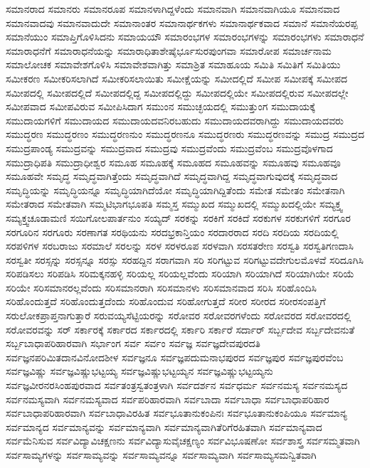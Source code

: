 {ಸಮಾನರಾದ
ಸಮಾನರು
ಸಮಾನರೂಪ
ಸಮಾನಳಾಗಿದ್ದಳೆಂದು
ಸಮಾನವಾಗಿ
ಸಮಾನವಾಗಿಯೂ
ಸಮಾನವಾದ
ಸಮಾನವಾದವು
ಸಮಾನವಾದುದೇ
ಸಮಾನಾಂತರ
ಸಮಾನಾರ್ಥಕಗಳು
ಸಮಾನಾರ್ಥಕವಾದ
ಸಮಾನೆ
ಸಮಾನೆಯರಪ್ಪ
ಸಮಾನೆಯುಂ
ಸಮಾಪ್ತಿಗೊಳಿಸಿದನು
ಸಮಾಯಯೌ
ಸಮಾರಂಭಗಳ
ಸಮಾರಂಭಗಳನ್ನು
ಸಮಾರಂಭಗಳು
ಸಮಾರಾಧನೆ
ಸಮಾರಾಧನೆಗೆ
ಸಮಾರಾಧನೆಯನ್ನು
ಸಮಾರಾಧಿತಾಶೇಷೈರ್ಭೂಸುರಪುಂಗವಾ
ಸಮಾರೋಪ
ಸಮಾರ್ಚನಾಮ
ಸಮಾಲೋಚಕ
ಸಮಾವೇಶಗೊಳಿಸಿ
ಸಮಾವೇಶವಾಗಿತ್ತು
ಸಮಾಶ್ರಿತ
ಸಮಾಹೂಯ
ಸಮಿತಿ
ಸಮಿತಿಗೆ
ಸಮಿತಿಯು
ಸಮೀಕರಣ
ಸಮೀಕರಿಸಲಾಗಿದೆ
ಸಮೀಕರಿಸಲಾಯಿತು
ಸಮೀಕ್ಷೆಯನ್ನು
ಸಮೀದಲ್ಲಿದೆ
ಸಮೀಪ
ಸಮೀಪಕ್ಕೆ
ಸಮೀಪದ
ಸಮೀಪದಲ್ಲಿ
ಸಮೀಪದಲ್ಲಿದೆ
ಸಮೀಪದಲ್ಲಿದ್ದ
ಸಮೀಪದಲ್ಲಿದ್ದು
ಸಮೀಪದಲ್ಲಿಯೇ
ಸಮೀಪದಲ್ಲಿರುವ
ಸಮೀಪದಲ್ಲೇ
ಸಮೀಪವಾದ
ಸಮೀಪವಿರುವ
ಸಮೀಪಿಸಿದಾಗ
ಸಮುಂನ
ಸಮುಚ್ಛಯದಲ್ಲಿ
ಸಮುತ್ತುಂಗ
ಸಮುದಾಯಕ್ಕೆ
ಸಮುದಾಯಗಳಿಗೆ
ಸಮುದಾಯದ
ಸಮುದಾಯದವನಿರಬಹುದು
ಸಮುದಾಯದವರಾಗಿದ್ದು
ಸಮುದಾಯದವರು
ಸಮುದ್ಧರಣ
ಸಮುದ್ಧರಣಂ
ಸಮುದ್ಧರಣನುಂ
ಸಮುದ್ಧರಣನೂ
ಸಮುದ್ಧರಣರು
ಸಮುದ್ಧರಣವನ್ನು
ಸಮುದ್ರ
ಸಮುದ್ರದ
ಸಮುದ್ರಪಾಂಡ್ಯ
ಸಮುದ್ರವನ್ನು
ಸಮುದ್ರವಾದ
ಸಮುದ್ರವು
ಸಮುದ್ರವೆಂದು
ಸಮುದ್ರವೆಂಬ
ಸಮುದ್ರವೊಳಗಾದ
ಸಮುದ್ರಾಧಿಪತಿ
ಸಮುದ್ರಾಧೀಶ್ವರ
ಸಮೂಹ
ಸಮೂಹಕ್ಕೆ
ಸಮೂಹದ
ಸಮೂಹವನ್ನು
ಸಮೂಹವು
ಸಮೂಹವೂ
ಸಮೂಹವೇ
ಸಮೃದ್ಧ
ಸಮೃದ್ಧವಾಗಿತ್ತೆಂದು
ಸಮೃದ್ಧವಾಗಿದೆ
ಸಮೃದ್ಧವಾಗಿದ್ದ
ಸಮೃದ್ಧವಾಗುವುದಕ್ಕೆ
ಸಮೃದ್ಧವಾದ
ಸಮೃದ್ಧಿಯನ್ನು
ಸಮೃದ್ಧಿಯನ್ನೂ
ಸಮೃದ್ಧಿಯಾಗಿದೆಯೋ
ಸಮೃದ್ಧಿಯಾಗಿದ್ದಿತೆಂದು
ಸಮೇತ
ಸಮೇತಂ
ಸಮೇತನಾಗಿ
ಸಮೇತರಾದ
ಸಮೇತವಾಗಿ
ಸಮ್ಮಟಿಭಾಗಭೂಪತಿ
ಸಮ್ಮಸ್ತ
ಸಮ್ಮುಖದ
ಸಮ್ಮುಖದಲ್ಲಿ
ಸಮ್ಮುಖದಲ್ಲಿಯೇ
ಸಮ್ಯಕ್ತ್ವ
ಸಮ್ಯಕ್ತ್ವಚೂಡಾಮಣಿ
ಸಯಿಗೋಲಪಾರ್ತನುಂ
ಸಯ್ಯದ್
ಸರಕನ್ನು
ಸರಕಿಗೆ
ಸರಕಿದೆ
ಸರಕುಗಳ
ಸರಕುಗಳಿಗೆ
ಸರಗೂರ
ಸರಗೂರಿನ
ಸರಗೂರು
ಸರಣಾಗತ
ಸರಥಿಯನು
ಸರದಭ್ರಕಾನ್ತಿಯಂ
ಸರದಾರರಾದ
ಸರದಿ
ಸರದಿಯ
ಸರದಿಯಲ್ಲಿ
ಸರಪಳಿಗಳ
ಸರಬರಾಜು
ಸರಮಾಲೆ
ಸರಲನ್ನು
ಸರಳ
ಸರಳರೂಪ
ಸರಳವಾಗಿ
ಸರಸತರೇಣ
ಸರಸ್ವತಿ
ಸರಸ್ವತಿಗಣದಾಸಿ
ಸರಸ್ವತೀ
ಸರಸ್ಸನ್ನು
ಸರಸ್ಸನ್ನೂ
ಸರಸ್ಸು
ಸರಹದ್ದಿನ
ಸರಾಗವಾಗಿ
ಸರಿ
ಸರಿಗಟ್ಟುವ
ಸರಿಗಟ್ಟುವದೇಗುಲಮೊಳವೆ
ಸರಿದೂಗಿಸಿ
ಸರಿಪಡಿಸಲು
ಸರಿಪಡಿಸಿ
ಸರಿಮಕ್ಕನಹಳ್ಳಿ
ಸರಿಯಲ್ಲ
ಸರಿಯಲ್ಲವೆಂದು
ಸರಿಯಾಗಿ
ಸರಿಯಾಗಿದೆ
ಸರಿಯಾಗಿಯೇ
ಸರಿಯೆ
ಸರಿಯೇ
ಸರಿಸಮಾನರಲ್ಲವೆಂದು
ಸರಿಸಮಾನರಾಗಿ
ಸರಿಸಮಾನಳು
ಸರಿಸಮಾನವಾದ
ಸರಿಸಿ
ಸರಿಹೊಂದಿಸಿ
ಸರಿಹೊಂದುತ್ತದೆ
ಸರಿಹೊಂದುತ್ತದೆಂದು
ಸರಿಹೊಂದುವ
ಸರಿಹೋಗುತ್ತದೆ
ಸರೀರ
ಸರೀರದ
ಸರೀರಸಂಪತ್ತಿಗೆ
ಸರುಲೋಕಪ್ರಾಪ್ತನಾಗುತ್ತಾರೆ
ಸರುವಯ್ಯಸೆಟ್ಟಿಯರನ್ನು
ಸರೋವರ
ಸರೋವರಗಳೆಂದು
ಸರೋವರದ
ಸರೋವರದಲ್ಲಿ
ಸರೋವರವನ್ನು
ಸರ್
ಸರ್ಕಾರಕ್ಕೆ
ಸರ್ಕಾರದ
ಸರ್ಕಾರದಲ್ಲಿ
ಸರ್ಕಾರಿ
ಸರ್ಕಾರೆ
ಸರ್ದಾರ್
ಸರ್ಬ್ಬದೇವ
ಸರ್ಬ್ಬದೇವನುತೆ
ಸರ್ಬ್ಬಬಾಧಾಪರಿಹಾರವಾಗಿ
ಸರ್ಭಾಂಗ
ಸರ್ವ
ಸರ್ವಂ
ಸರ್ವಜ್ಞ
ಸರ್ವಜ್ಞದೇವಪುರದತಿ
ಸರ್ವಜ್ಞನಪರಿಮಿತದಾನವಿನೋದಶೀಳ
ಸರ್ವಜ್ಞನೂ
ಸರ್ವಜ್ಞಪದುಮನಾಭಪುರದ
ಸರ್ವಜ್ಞಪುರ
ಸರ್ವಜ್ಞಪುರವೆಂಬ
ಸರ್ವಜ್ಞವಿಷ್ಣು
ಸರ್ವಜ್ಞವಿಷ್ಣುಭಟ್ಟಯ್ಯ
ಸರ್ವಜ್ಞವಿಷ್ಣುಭಟ್ಟಯ್ಯನ
ಸರ್ವಜ್ಞವಿಷ್ಣುಭಟ್ಟಯ್ಯನು
ಸರ್ವಜ್ಞವೀರನರಸಿಂಹಪುರವಾದ
ಸರ್ವತಂತ್ರಸ್ವತಂತ್ರಳಾಗಿ
ಸರ್ವದರ್ಶನ
ಸರ್ವಧರ್ಮ
ಸರ್ವನಮಸ್ಯ
ಸರ್ವನಮಸ್ಯದ
ಸರ್ವನಮಸ್ಯವಾಗಿ
ಸರ್ವನಮಸ್ಯವಾದ
ಸರ್ವಪರಿಹಾರವಾಗಿ
ಸರ್ವಬಾದಾ
ಸರ್ವಬಾಧಾ
ಸರ್ವಬಾಧಾಪರಿಹಾರ
ಸರ್ವಬಾಧಾಪರಿಹಾರವಾಗಿ
ಸರ್ವಬಾಧಾವಿರಹಿತ
ಸರ್ವಭೂತಾನುಕಂಪಿನಃ
ಸರ್ವಭೂತಾನುಕಂಪಿಯೂ
ಸರ್ವಮಾನ್ಯ
ಸರ್ವಮಾನ್ಯದ
ಸರ್ವಮಾನ್ಯವನ್ನು
ಸರ್ವಮಾನ್ಯವಾಗಿ
ಸರ್ವಮಾನ್ಯವಾಗಿತೆರಿಗೆರಹಿತವಾಗಿ
ಸರ್ವಮಾನ್ಯವಾದ
ಸರ್ವಮೆನಿಸುವ
ಸರ್ವವಿದ್ಯಾವಿಚಕ್ಷಣನು
ಸರ್ವವಿದ್ಯಾಸುವೈಚಕ್ಷಣ್ಯಂ
ಸರ್ವವಿಭೂಷಣೋ
ಸರ್ವಶಾಸ್ತ್ರ
ಸರ್ವಸಮ್ಮತವಾಗಿ
ಸರ್ವಸಾಮ್ಯಗಳನ್ನು
ಸರ್ವಸಾಮ್ಯವನ್ನು
ಸರ್ವಸಾಮ್ಯವನ್ನೂ
ಸರ್ವಸಾಮ್ಯವಾಗಿ
ಸರ್ವಸಾಮ್ಯಸಮನ್ವಿತವಾಗಿ
}
